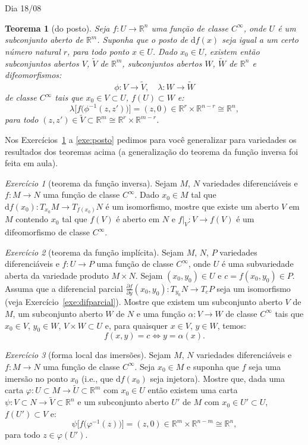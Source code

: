 \documentclass[oneside,11pt]{amsart}
\newcommand{\R}{\mathds R}
\newcommand{\dd}{\mathrm d}
\theoremstyle{remark}\newtheorem{exercise}{Exercício}[section]
\theoremstyle{plain}\newtheorem{teo}{Teorema}[section]
\theoremstyle{plain}\newtheorem{lem}[teo]{Lema}
\theoremstyle{plain}\newtheorem{prop}[teo]{Proposição}
\theoremstyle{definition}\newtheorem{defin}[teo]{Definição}
\theoremstyle{remark}\newtheorem{rem}[teo]{Observação}
\theoremstyle{definition}\newtheorem{example}[teo]{Exemplo}
\numberwithin{equation}{section}
\begin{document}
\begin{section}{Dia 18/08}
\begin{teo}[do posto]
Seja $f:U\to\R^n$ uma função de classe $C^\infty$, onde $U$ é um subconjunto aberto de $\R^m$. Suponha que o posto
de $\dd f(x)$ seja igual a um certo número natural $r$, para todo ponto $x\in U$. Dado $x_0\in U$, existem então
subconjuntos abertos $V$, $\widetilde V$ de $\R^m$, subconjuntos abertos $W$, $\widetilde W$ de $\R^n$ e
difeomorfismos:
\[\phi:V\longrightarrow\widetilde V,\quad\lambda:W\longrightarrow\widetilde W\]
de classe $C^\infty$ tais que $x_0\in V\subset U$, $f(U)\subset W$ e:
\[\lambda\big[f\big(\phi^{-1}(z,z')\big)\big]=(z,0)\in\R^r\times\R^{n-r}\cong\R^n,\]
para todo $(z,z')\in\widetilde V\subset\R^m\cong\R^r\times\R^{m-r}$.
\end{teo}

Nos Exercícios~\ref{exe:invfunc} a \ref{exe:posto} pedimos para você generalizar para variedades os resultados dos teoremas acima
(a generalização do teorema da função inversa foi feita em aula).
\begin{exercise}[teorema da função inversa]\label{exe:invfunc}
Sejam $M$, $N$ variedades diferenciáveis e $f:M\to N$ uma função de classe $C^\infty$. Dado $x_0\in M$ tal que
$\dd f(x_0):T_{x_0}M\to T_{f(x_0)}N$ é um isomorfismo, mostre que existe um aberto $V$ em $M$ contendo $x_0$ tal que $f(V)$
é aberto em $N$ e $f\vert_V:V\to f(V)$ é um difeomorfismo de classe $C^\infty$.
\end{exercise}

\begin{exercise}[teorema da função implícita]
Sejam $M$, $N$, $P$ variedades diferenciáveis e $f:U\to P$ uma função de classe $C^\infty$, onde $U$ é uma subvariedade
aberta da variedade produto $M\times N$. Sejam $(x_0,y_0)\in U$ e $c=f(x_0,y_0)\in P$. Assuma que a diferencial parcial
$\frac{\partial f}{\partial y}(x_0,y_0):T_{y_0}N\to T_cP$ seja um isomorfismo (veja Exercício~\ref{exe:difparcial}).
Mostre que existem um subconjunto aberto $V$ de $M$, um subconjunto aberto $W$ de $N$ e uma função $\alpha:V\to W$
de classe $C^\infty$ tais que $x_0\in V$, $y_0\in W$, $V\times W\subset U$ e, para quaisquer $x\in V$, $y\in W$, temos:
\[f(x,y)=c\Longleftrightarrow y=\alpha(x).\]
\end{exercise}

\begin{exercise}[forma local das imersões]
Sejam $M$, $N$ variedades diferenciáveis e $f:M\to N$ uma função de classe $C^\infty$. Seja $x_0\in M$ e suponha
que $f$ seja uma imersão no ponto $x_0$ (i.e., que $\dd f(x_0)$ seja injetora). Mostre que, dada uma carta
$\varphi:U\subset M\to\widetilde U\subset\R^m$ com $x_0\in U$ então existem uma carta $\psi:V\subset N\to\widetilde V\subset\R^n$
e um subconjunto aberto $U'$ de $M$ com $x_0\in U'\subset U$, $f(U')\subset V$ e:
\[\psi\big[f\big(\varphi^{-1}(z)\big)\big]=(z,0)\in\R^m\times\R^{n-m}\cong\R^n,\]
para todo $z\in\varphi(U')$.
\end{exercise}


\end{section}
\end{document}
